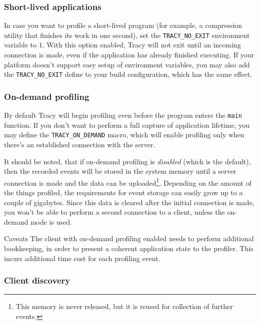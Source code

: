 \documentclass[hidelinks,titlepage,a4paper]{article}
\begin{document}
\subsubsection{Short-lived applications}

In case you want to profile a short-lived program (for example, a compression utility that finishes its work in one second), set the \texttt{TRACY\_NO\_EXIT} environment variable to $1$. With this option enabled, Tracy will not exit until an incoming connection is made, even if the application has already finished executing. If your platform doesn't support easy setup of environment variables, you may also add the \texttt{TRACY\_NO\_EXIT} define to your build configuration, which has the same effect.

\subsubsection{On-demand profiling}
\label{ondemand}

By default Tracy will begin profiling even before the program enters the \texttt{main} function. If you don't want to perform a full capture of application lifetime, you may define the \texttt{TRACY\_ON\_DEMAND} macro, which will enable profiling only when there's an established connection with the server.

It should be noted, that if on-demand profiling is \emph{disabled} (which is the default), then the recorded events will be stored in the system memory until a server connection is made and the data can be uploaded\footnote{This memory is never released, but it is reused for collection of further events.}. Depending on the amount of the things profiled, the requirements for event storage can easily grow up to a couple of gigabytes. Since this data is cleared after the initial connection is made, you won't be able to perform a second connection to a client, unless the on-demand mode is used.

\begin{bclogo}[
noborder=true,
couleur=black!5,
logo=\bcattention
]{Caveats}
The client with on-demand profiling enabled needs to perform additional bookkeeping, in order to present a coherent application state to the profiler. This incurs additional time cost for each profiling event.
\end{bclogo}

\subsubsection{Client discovery}
\end{document}
